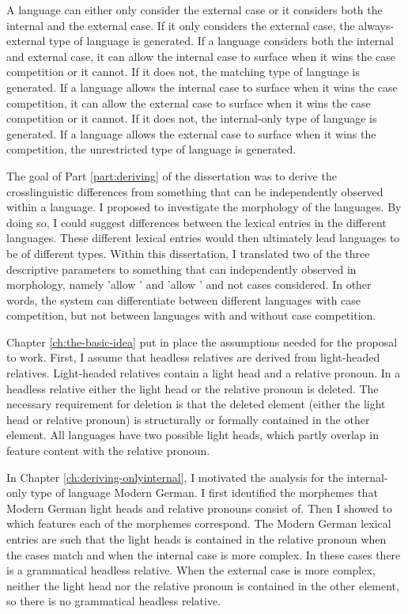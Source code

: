 A language can either only consider the external case or it considers both the internal and the external case. If it only considers the external case, the always-external type of language is generated.
If a language considers both the internal and external case, it can allow the internal case to surface when it wins the case competition or it cannot. If it does not, the matching type of language is generated.
If a language allows the internal case to surface when it wins the case competition, it can allow the external case to surface when it wins the case competition or it cannot. If it does not, the internal-only type of language is generated.
If a language allows the external case to surface when it wins the competition, the unrestricted type of language is generated.

The goal of Part \ref{part:deriving} of the dissertation was to derive the crosslinguistic differences from something that can be independently observed within a language. I proposed to investigate the morphology of the languages. By doing so, I could suggest differences between the lexical entries in the different languages. These different lexical entries would then ultimately lead languages to be of different types. Within this dissertation, I translated two of the three descriptive parameters to something that can independently observed in morphology, namely 'allow ' and 'allow ' and not cases considered. In other words, the system can differentiate between different languages with case competition, but not between languages with and without case competition.

Chapter \ref{ch:the-basic-idea} put in place the assumptions needed for the proposal to work. First, I assume that headless relatives are derived from light-headed relatives. Light-headed relatives contain a light head and a relative pronoun. In a headless relative either the light head or the relative pronoun is deleted. The necessary requirement for deletion is that the deleted element (either the light head or relative pronoun) is structurally or formally contained in the other element. All languages have two possible light heads, which partly overlap in feature content with the relative pronoun.

In Chapter \ref{ch:deriving-onlyinternal}, I motivated the analysis for the internal-only type of language Modern German. I first identified the morphemes that Modern German light heads and relative pronouns consist of. Then I showed to which features each of the morphemes correspond. The Modern German lexical entries are such that the light heads is contained in the relative pronoun when the cases match and when the internal case is more complex. In these cases there is a grammatical headless relative. When the external case is more complex, neither the light head nor the relative pronoun is contained in the other element, so there is no grammatical headless relative.


